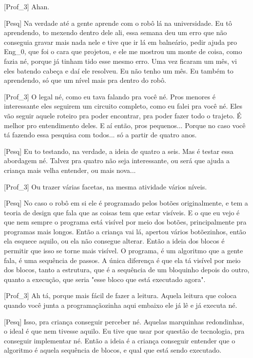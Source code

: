 [Prof\_3] Ahan.

[Pesq] Na verdade até a gente aprende com o robô lá na universidade. Eu tô aprendendo, to mexendo dentro dele ali, essa semana deu um erro que não conseguia gravar mais nada nele e tive que ir lá em balneário, pedir ajuda pro Eng\_0, que foi o cara que projetou, e ele me mostrou um monte de coisa, como fazia né, porque já tinham tido esse mesmo erro. Uma vez ficaram um mês, vi eles batendo cabeça e daí ele resolveu. Eu não tenho um mês. Eu também to aprendendo, só que um nível mais pra dentro do robô.

[Prof\_3] O legal né, como eu tava falando pra você né. Pros menores é interessante eles seguirem um circuito completo, como eu falei pra você né. Eles vão seguir aquele roteiro pra poder encontrar, pra poder fazer todo o trajeto. É melhor pro entendimento deles. E aí então, pros pequenos... Porque no caso você tá fazendo essa pesquisa com todos... só a partir de quatro anos.

[Pesq] Eu to testando, na verdade, a ideia de quatro a seis. Mas é testar essa abordagem né. Talvez pra quatro não seja interessante, ou será que ajuda a criança mais velha entender, ou mais nova... 

[Prof\_3] Ou trazer várias facetas, na mesma atividade vários níveis.

[Pesq] No caso o robô em si ele é programado pelos botões originalmente, e tem a teoria de design que fala que as coisas tem que estar visíveis. E o que eu vejo é que nem sempre o programa está visível por meio dos botões, principalmente pra programas mais longos. Então a criança vai lá, apertou vários botõezinhos, então ela esquece aquilo, ou ela não consegue alterar. Então a ideia dos blocos é permitir que isso se torne mais visível. O programa, é um algoritmo que a gente fala, é uma sequência de passos. A única diferença é que ela tá visível por meio dos blocos, tanto a estrutura, que é a sequência de um bloquinho depois do outro, quanto a execução, que seria "esse bloco que está executado agora".

[Prof\_3] Ah tá, porque mais fácil de fazer a leitura. Aquela leitura que coloca quando você junta a programaçãozinha aqui embaixo ele já lê e já executa né.

[Pesq] Isso, pra criança conseguir perceber né. Aquelas marquinhas redondinhas, o ideal é que nem tivesse aquilo. Eu tive que usar por questão de tecnologia, pra conseguir implementar né. Então a ideia é a criança conseguir entender que o algoritmo é aquela sequência de blocos, e qual que está sendo executado.


